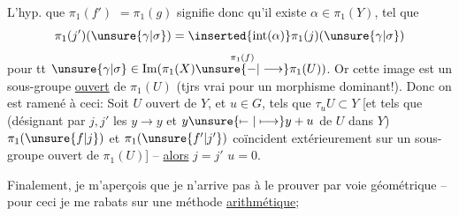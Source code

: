 L'hyp. que $\pi_1(f')$  $=\pi_1(g)$ signifie donc qu'il existe $\alpha\in\pi_1(Y)$, tel que
\[
\pi_1(j')(\unsure{\gamma|\sigma})=\inserted{\operatorname{int}(\alpha)}\pi_1(j)(\unsure{\gamma|\sigma})
\]
pour tt $\unsure{\gamma|\sigma}\in\operatorname{Im}(\pi_1(X)\overset{\pi_1(f)}{\unsure{-|\longrightarrow}}\pi_1(U))$. Or cette image est un sous-groupe \uline{ouvert} de $\pi_1(U)$ (tjrs vrai pour un morphisme dominant!).  Donc on est ramené à ceci: Soit $U$ ouvert \inserted{$\ne\varnothing$} de $Y$, et $u\in G$, tels que $\tau_uU\subset Y$ [et tels que (désignant par $j,j'$ les   $y\longrightarrow y$ et $y\unsure{\mapstochar\relbar|\longmapsto}y+u$ de $U$ dans $Y$) $\pi_1(\unsure{f|j})$ et $\pi_1(\unsure{f'|j'})$ coïncident extérieurement sur un sous-groupe ouvert de $\pi_1(U)$] -- \uline{alors} $j=j'$  $u=0$.


Finalement, je m'aperçois que je n'arrive pas à le prouver par voie géométrique -- pour ceci je me rabats sur une méthode \uline{arithmétique};

